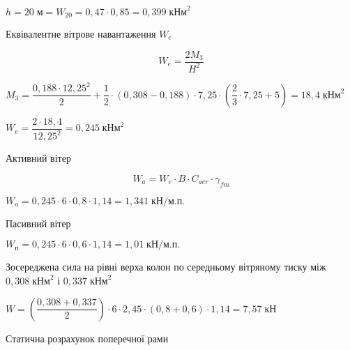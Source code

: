 \documentclass[a4paper,14pt]{article}
\begin{document}
$h=20\;\textit{м} = W_{20}= 0,47\cdot 0,85 = 0,399\;\textit{кНм}^2$

Еквівалентне вітрове навантаження $W_e$

\begin{equation}
    W_\textit{e}= \dfrac{2M_3}{H^2}
\end{equation}

$M_3 = \dfrac{0,188\cdot 12,25^2}{2}+\dfrac {1}{2}\cdot (0,308-0,188)\cdot 7,25 \cdot \left(\dfrac {2}{3}\cdot 7,25 + 5\right)= 18,4\;\textit{кНм}^2$ 

$W_\textit{e}= \dfrac{2\cdot 18,4}{12,25^2}= 0,245\;\textit{кНм}^2$ 

Активний вітер 

\begin{equation}
    W_\textit{a}= W_\textit{e} \cdot B\cdot C_{aer}\cdot \gamma_{fm} 
\end{equation}

$W_\textit{a}= 0,245 \cdot 6\cdot 0,8\cdot 1,14 = 1,341\;\textit{кН/м.п.}$   

Пасивний вітер

$W_\textit{п}= 0,245 \cdot 6\cdot 0,6\cdot 1,14 = 1,01\;\textit{кН/м.п.}$ 

Зосереджена сила на рівні верха колон по середньому вітряному тиску між $0,308\;\textit{кНм}^2$ і $0,337\;\textit{кНм}^2$

$W = \left(\dfrac{0,308+0,337}{2}\right)\cdot 6 \cdot 2,45 \cdot (0,8+0,6)\cdot 1,14 = 7,57\;\textit{кН}$ 


Статична розрахунок поперечної рами 
\end{document}
